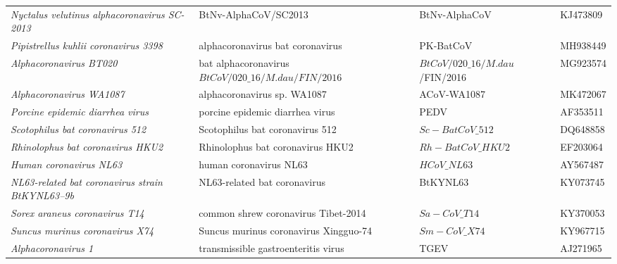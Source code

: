 \begin{table}[H]
\begin{tabularx}{\textwidth}{@{}>{\raggedright\arraybackslash}p{4cm}>{\raggedright\arraybackslash}p{4.5cm}>{\raggedright\arraybackslash}p{3cm}>{\raggedright\arraybackslash}X@{}}
    \textit{Nyctalus velutinus alphacoronavirus SC-2013}            & BtNv-AlphaCoV/SC2013                                 & BtNv-AlphaCoV                                 &  KJ473809             \\
    \textit{Pipistrellus kuhlii coronavirus 3398}                   & alphacoronavirus bat coronavirus                     & PK-BatCoV                                     &  MH938449             \\
    \textit{Alphacoronavirus BT020}                                 & bat alphacoronavirus $BtCoV/020\_{16/M.dau/FIN/2016}$     & $BtCoV/020\_{16/M.dau}$ /FIN/2016        &  MG923574             \\
    \textit{Alphacoronavirus WA1087}                                & alphacoronavirus sp. WA1087                          & ACoV-WA1087                                   &  MK472067             \\
    \textit{Porcine epidemic diarrhea virus}                        & porcine epidemic diarrhea virus                      & PEDV                                          &  AF353511             \\
    \textit{Scotophilus bat coronavirus 512}                        & Scotophilus bat coronavirus 512                      & $Sc-BatCoV\_{512}$                            &  DQ648858             \\
    \textit{Rhinolophus bat coronavirus HKU2}                       & Rhinolophus bat coronavirus HKU2                     & $Rh-BatCoV\_{HKU2}$                           &  EF203064             \\
    \textit{Human coronavirus NL63}                                 & human coronavirus NL63                               & $HCoV\_{NL63}$                                &  AY567487             \\
    \textit{NL63-related bat coronavirus strain BtKYNL63--9b}       & NL63-related bat coronavirus                         & BtKYNL63                                      &  KY073745             \\
    \textit{Sorex araneus coronavirus T14}                          & common shrew coronavirus Tibet-2014                  & $Sa-CoV\_{T14}$                               &  KY370053             \\ 
    \textit{Suncus murinus coronavirus X74}                         & Suncus murinus coronavirus Xingguo-74                & $Sm-CoV\_{X74}$                               &  KY967715             \\
    \textit{Alphacoronavirus 1}                                     & transmissible gastroenteritis virus                  & TGEV                                          &  AJ271965             \\ 
    \end{tabularx}
\end{table}

